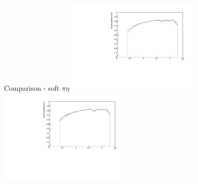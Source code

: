 \documentclass[11pt]{beamer}
\begin{document}
\begin{frame}{Comparison - soft $\pi \eta$}
\centering
\includegraphics[width=0.48\textwidth]{fourth/up_pdf/combined/h_eta_reco_SPi.pdf}
\includegraphics[width=0.48\textwidth]{fourth/down_pdf/combined/h_eta_reco_SPi.pdf}
\end{frame}
\end{document}
